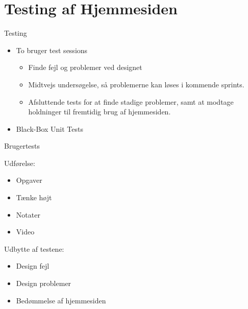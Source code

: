 \section{Testing af Hjemmesiden}

\begin{frame}{Testing}
	
	\begin{itemize}
	\item	To bruger test sessions
		\begin{itemize}
			\item Finde fejl og problemer ved designet
			\item Midtvejs undersøgelse, så problemerne kan løses i kommende sprints.
			\item Afsluttende tests for at finde stadige problemer, samt at modtage holdninger til fremtidig brug af hjemmesiden.
		\end{itemize}
	\item 	Black-Box Unit Tests
	
	\end{itemize}
	
\end{frame}

\begin{frame}{Brugertests}
	
	Udførelse:
	\begin{itemize}
		\item Opgaver 
		\item Tænke højt
		\item Notater
		\item Video		
	\end{itemize}
	
	Udbytte af testene:
	\begin{itemize}
		\item Design fejl
		\item Design problemer
		\item Bedømmelse af hjemmesiden
	\end{itemize}
	
\end{frame}


